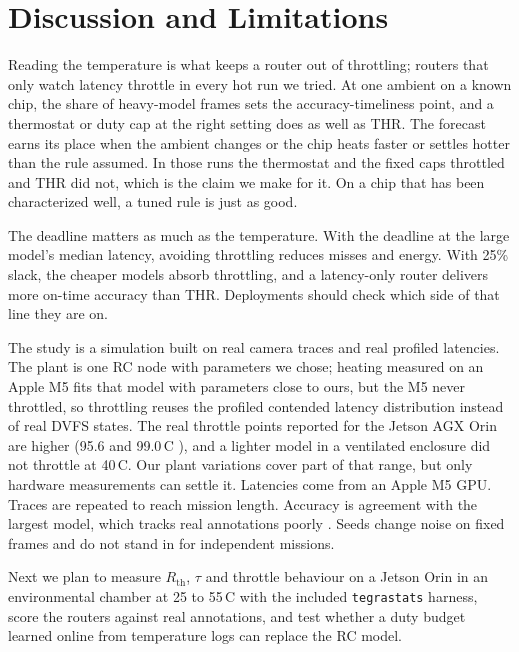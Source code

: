 \documentclass[conference,compsoc]{IEEEtran}
\newcommand{\degc}{\,\textdegree C}
\begin{document}
\section{Discussion and Limitations}

Reading the temperature is what keeps a router out of throttling;
routers that only watch latency throttle in every hot run we tried. At
one ambient on a known chip, the share of heavy-model frames sets the
accuracy-timeliness point, and a thermostat or duty cap at the right
setting does as well as THR. The forecast earns its place when the
ambient changes or the chip heats faster or settles hotter than the rule
assumed. In those runs the thermostat and the fixed caps throttled and
THR did not, which is the claim we make for it. On a chip that has
been characterized well, a tuned rule is just as good.

The deadline matters as much as the temperature. With the deadline at
the large model's median latency, avoiding throttling reduces misses
and energy. With 25\% slack, the cheaper models absorb throttling, and
a latency-only router delivers more on-time accuracy than THR.
Deployments should check which side of that line they are on.

The study is a simulation built on real camera traces and real
profiled latencies. The plant is one RC node with parameters we chose;
heating measured on an Apple M5 fits that model with parameters close
to ours, but the M5 never throttled, so throttling reuses the profiled
contended latency distribution instead of real DVFS states. The real throttle points reported for the
Jetson AGX Orin are higher (95.6 and 99.0\degc{} \cite{krislauks2026orin}),
and a lighter model in a ventilated enclosure did not throttle at
40\degc. Our plant variations cover part of that range, but only
hardware measurements can settle it. Latencies come from an Apple M5
GPU. Traces are repeated to reach mission length. Accuracy is
agreement with the largest model, which tracks real annotations poorly
\cite{roy2026beliefspace}. Seeds change noise on fixed frames and do not
stand in for independent missions.

Next we plan to measure $R_{\mathrm{th}}$, $\tau$ and throttle behaviour
on a Jetson Orin in an environmental chamber at 25 to 55\degc{} with
the included \texttt{tegrastats} harness, score the routers against
real annotations, and test whether a duty budget learned online from
temperature logs can replace the RC model.
\end{document}
